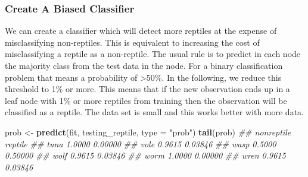 \documentclass[
  notitlepage]{book}
\newenvironment{Shaded}{\begin{snugshade}}{\end{snugshade}}
\newcommand{\CommentTok}[1]{\textcolor[rgb]{0.56,0.35,0.01}{\textit{#1}}}
\newcommand{\DataTypeTok}[1]{\textcolor[rgb]{0.13,0.29,0.53}{#1}}
\newcommand{\KeywordTok}[1]{\textcolor[rgb]{0.13,0.29,0.53}{\textbf{#1}}}
\newcommand{\NormalTok}[1]{#1}
\newcommand{\StringTok}[1]{\textcolor[rgb]{0.31,0.60,0.02}{#1}}
\begin{document}
\hypertarget{create-a-biased-classifier}{%
\subsubsection{Create A Biased Classifier}\label{create-a-biased-classifier}}

We can create a classifier which will detect more reptiles at the
expense of misclassifying non-reptiles. This is equivalent to increasing
the cost of misclassifying a reptile as a non-reptile. The usual rule is
to predict in each node the majority class from the test data in the
node. For a binary classification problem that means a probability of
\textgreater50\%. In the following, we reduce this threshold to 1\% or more. This
means that if the new observation ends up in a leaf node with 1\% or more
reptiles from training then the observation will be classified as a
reptile. The data set is small and this works better with more data.

\begin{Shaded}
\begin{Highlighting}[]
\NormalTok{prob \textless{}{-}}\StringTok{ }\KeywordTok{predict}\NormalTok{(fit, testing\_reptile, }\DataTypeTok{type =} \StringTok{"prob"}\NormalTok{)}
\KeywordTok{tail}\NormalTok{(prob)}
\CommentTok{\#\#      nonreptile reptile}
\CommentTok{\#\# tuna     1.0000 0.00000}
\CommentTok{\#\# vole     0.9615 0.03846}
\CommentTok{\#\# wasp     0.5000 0.50000}
\CommentTok{\#\# wolf     0.9615 0.03846}
\CommentTok{\#\# worm     1.0000 0.00000}
\CommentTok{\#\# wren     0.9615 0.03846}
\end{Highlighting}
\end{Shaded}
\end{document}
